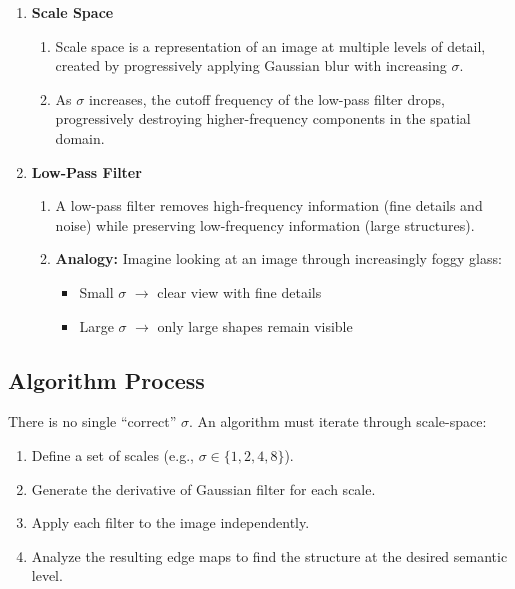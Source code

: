 \documentclass[12pt]{article}
\begin{document}
\begin{enumerate}
    \item \textbf{Scale Space}
          \begin{enumerate}
              \item Scale space is a representation of an image at multiple levels of detail, created by progressively applying Gaussian blur with increasing $\sigma$.
              \item As $\sigma$ increases, the cutoff frequency of the low-pass filter drops, progressively destroying higher-frequency components in the spatial domain.
          \end{enumerate}
    \item \textbf{Low-Pass Filter}
          \begin{enumerate}
              \item A low-pass filter removes high-frequency information (fine details and noise) while preserving low-frequency information (large structures).
              \item \textbf{Analogy:}
                    Imagine looking at an image through increasingly foggy glass:
                    \begin{itemize}
                        \item Small $\sigma$ $\rightarrow$ clear view with fine details
                        \item Large $\sigma$ $\rightarrow$ only large shapes remain visible
                    \end{itemize}
          \end{enumerate}
\end{enumerate}


\subsection{Algorithm Process}

There is no single ``correct'' $\sigma$. An algorithm must iterate through scale-space:

\begin{enumerate}
    \item Define a set of scales (e.g., $\sigma \in \{1,2,4,8\}$).
    \item Generate the derivative of Gaussian filter for each scale.
    \item Apply each filter to the image independently.
    \item Analyze the resulting edge maps to find the structure at the desired semantic level.
\end{enumerate}
\end{document}

